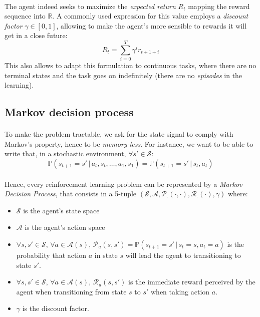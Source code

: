 \documentclass[a4paper]{report}
\begin{document}
{{{				\paragraph{} The agent indeed seeks to maximize the \emph{expected return} $R_t$ mapping the reward sequence into $\mathbb{R}$. A commonly used expression for this value employs a \emph{discount factor} $\gamma \in [0,1]$, allowing to make the agent's more sensible to rewards it will get in a close future: 
				\begin{equation}
					R_t = \sum_{i=0}^T \gamma^i r_{t+1+i}
				\end{equation}
				This also allows to adapt this formulation to continuous tasks, where there are no terminal states and the task goes on indefinitely (there are no \emph{episodes} in the learning). 
			}
			\subsection{Markov decision process}
			{
				\paragraph{} To make the problem tractable, we ask for the state signal to comply with Markov's property, hence to be \emph{memory-less}. For instance, we want to be able to write that, in a stochastic environment, $\forall s'\in\mathcal{S}$: 
				\begin{equation}
					\mathbb{P}\left( s_{t+1}=s' \, \vert \, a_t, s_t, \hdots, a_1,s_1\right) = \mathbb{P}\left( s_{t+1}=s' \, \vert \, s_t, a_t\right)
				\end{equation}
				
				\paragraph{} Hence, every reinforcement learning problem can be represented by a \emph{Markov Decision Process}, that consists in a 5-tuple $\left(\mathcal{S}, \mathcal{A}, \mathcal{P}_{\cdot}(\cdot,\cdot), \mathcal{R}_{\cdot}(\cdot), \gamma \right)$ where: 
				\begin{itemize}[label=$\triangleright$]
					\item $\mathcal{S}$ is the agent's state space
					\item $\mathcal{A}$ is the agent's action space
					\item $\forall s,s'\in\mathcal{S}, \, \forall a\in\mathcal{A}(s)$,  $\mathcal{P}_a(s,s') = \mathbb{P}(s_{t+1}=s'\, \vert \, s_t = s, a_t = a)$ is the probability that action $a$ in state $s$ will lead the agent to transitioning to state $s'$.
					\item $\forall s,s'\in\mathcal{S}, \, \forall a\in\mathcal{A}(s)$,  $\mathcal{R}_a(s,s')$ is the immediate reward perceived by the agent when transitioning from state $s$ to $s'$ when taking action $a$. 
					\item $\gamma$ is the discount factor. 
				\end{itemize}
				
}}}
\end{document}
